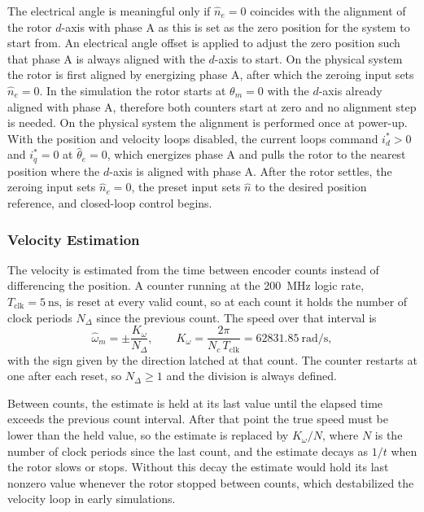 The electrical angle is meaningful only if $\hat{n}_e = 0$ coincides with the alignment of the rotor $d$-axis with phase A as this is set as the zero position for the system to start from. An electrical angle offset is applied to adjust the zero position such that phase A is always aligned with the $d$-axis to start. On the physical system the rotor is first aligned by energizing phase A, after which the zeroing input sets $\hat{n}_e = 0$. In the simulation the rotor starts at $\theta_m = 0$ with the $d$-axis already aligned with phase A, therefore both counters start at zero and no alignment step is needed. On the physical system the alignment is performed once at power-up. With the position and velocity loops disabled, the current loops command $i_d^{*} > 0$ and $i_q^{*} = 0$ at $\hat{\theta}_e = 0$, which energizes phase A and pulls the rotor to the nearest position where the $d$-axis is aligned with phase A. After the rotor settles, the zeroing input sets $\hat{n}_e = 0$, the preset input sets $\hat{n}$ to the desired position reference, and closed-loop control begins.


\subsubsection{Velocity Estimation}\label{sec:velocityEstimation}


The velocity is estimated from the time between encoder counts instead of differencing the position. A counter running at the \SI{200}{\mega\hertz} logic rate, $T_{\mathrm{clk}} = \SI{5}{\nano\second}$, is reset at every valid count, so at each count it holds the number of clock periods $N_\Delta$ since the previous count. The speed over that interval is
\begin{equation}
	\hat{\omega}_m = \pm \frac{K_\omega}{N_\Delta},
	\qquad
	K_\omega = \frac{2\pi}{N_c\, T_{\mathrm{clk}}} = \SI{62831.85}{\radian\per\second},
	\label{eq:vel_period}
\end{equation}
with the sign given by the direction latched at that count. The counter restarts at one after each reset, so $N_\Delta \ge 1$ and the division is always defined.

Between counts, the estimate is held at its last value until the elapsed time exceeds the previous count interval. After that point the true speed must be lower than the held value, so the estimate is replaced by $K_\omega/N$, where $N$ is the number of clock periods since the last count, and the estimate decays as $1/t$ when the rotor slows or stops. Without this decay the estimate would hold its last nonzero value whenever the rotor stopped between counts, which destabilized the velocity loop in early simulations.

